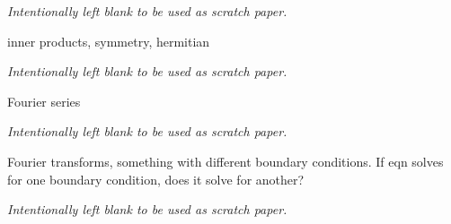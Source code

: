 \documentclass[12pt]{amsbook}
\begin{document}
\newpage
\emph{Intentionally left blank to be used as scratch paper.}\\


\newpage
\begin{problem}
inner products, symmetry, hermitian
\end{problem}

\newpage
\emph{Intentionally left blank to be used as scratch paper.}\\


\newpage
\begin{problem} 
 Fourier series
\end{problem}

\newpage
\emph{Intentionally left blank to be used as scratch paper.}\\


\newpage
\begin{problem}
Fourier transforms, something with different boundary conditions. If eqn solves for one boundary condition, does it solve for another?
\end{problem}
\newpage
\emph{Intentionally left blank to be used as scratch paper.}\\
\end{document}
